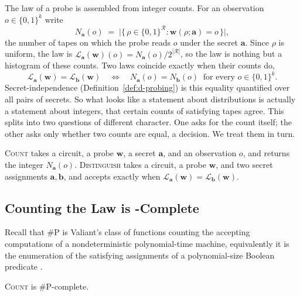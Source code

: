   The law of a probe is assembled from integer counts. For an observation
  $o \in \{0,1\}^{k}$ write
  \[
    N_{\mathbf{a}}(o) \;=\; \big|\{\, \rho \in \{0,1\}^{\mathcal{R}} : \mathbf{w}(\rho; \mathbf{a}) = o \,\}\big| ,
  \]
  the number of tapes on which the probe reads $o$ under the secret $\mathbf{a}$.
  Since $\rho$ is uniform, the law is
  $\mathcal{L}_{\mathbf{a}}(\mathbf{w})(o) = N_{\mathbf{a}}(o) / 2^{|\mathcal{R}|}$, so the
  law is nothing but a histogram of these counts. Two laws coincide
  exactly when their counts do,
  \[
    \mathcal{L}_{\mathbf{a}}(\mathbf{w}) = \mathcal{L}_{\mathbf{b}}(\mathbf{w})
    \quad\Longleftrightarrow\quad
    N_{\mathbf{a}}(o) = N_{\mathbf{b}}(o) \ \text{ for every } o \in \{0,1\}^{k} .
  \]
  Secret-independence (Definition~\ref{def:d-probing}) is this equality quantified
  over all pairs of secrets. So what looks like a statement about distributions is
  actually a statement about integers, that certain counts of satisfying tapes agree.
  This splits into two questions of different character. One asks for the count itself;
  the other asks only whether two counts are equal, a decision. We treat them in turn.

  \begin{definition}
  \label{def:count-distinguish}
  \textsc{Count} takes a circuit, a probe $\mathbf{w}$, a secret $\mathbf{a}$, and an
  observation $o$, and returns the integer $N_{\mathbf{a}}(o)$.
  \textsc{Distinguish} takes a circuit, a probe $\mathbf{w}$, and two secret assignments
  $\mathbf{a}, \mathbf{b}$, and accepts exactly when
  $\mathcal{L}_{\mathbf{a}}(\mathbf{w}) = \mathcal{L}_{\mathbf{b}}(\mathbf{w})$.
  \end{definition}

  \subsection{Counting the Law is -Complete}
  \label{sec:sharpp}

  Recall that $\#\mathrm{P}$ is Valiant's class of functions counting the accepting
  computations of a nondeterministic polynomial-time machine, equivalently it is the
  enumeration of the satisfying assignments of a polynomial-size Boolean predicate
  \parencite{valiant1979complexity}.

  \begin{proposition}
  \label{prop:count-sharpp}
  \textsc{Count} is $\#\mathrm{P}$-complete.
  \end{proposition}

